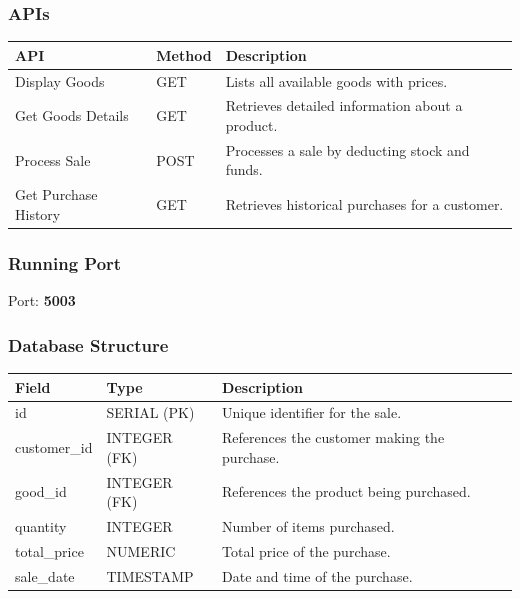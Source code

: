 \documentclass[a4paper,12pt]{article}
\begin{document}
\subsubsection{APIs}
\begin{longtable}{|p{4cm}|p{2cm}|p{7cm}|}
\hline
\textbf{API} & \textbf{Method} & \textbf{Description} \\
\hline
Display Goods & GET & Lists all available goods with prices. \\
\hline
Get Goods Details & GET & Retrieves detailed information about a product. \\
\hline
Process Sale & POST & Processes a sale by deducting stock and funds. \\
\hline
Get Purchase History & GET & Retrieves historical purchases for a customer. \\
\hline
\end{longtable}

\subsubsection{Running Port}
Port: \textbf{5003}

\subsubsection{Database Structure}
\begin{longtable}{|p{3cm}|p{3cm}|p{8cm}|}
\hline
\textbf{Field} & \textbf{Type} & \textbf{Description} \\
\hline
id & SERIAL (PK) & Unique identifier for the sale. \\
\hline
customer\_id & INTEGER (FK) & References the customer making the purchase. \\
\hline
good\_id & INTEGER (FK) & References the product being purchased. \\
\hline
quantity & INTEGER & Number of items purchased. \\
\hline
total\_price & NUMERIC & Total price of the purchase. \\
\hline
sale\_date & TIMESTAMP & Date and time of the purchase. \\
\hline
\end{longtable}
\end{document}
